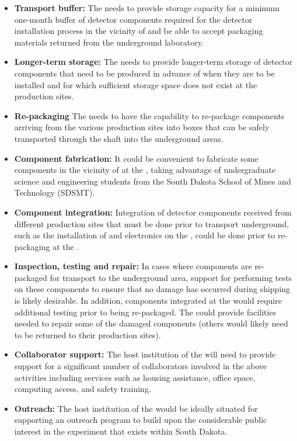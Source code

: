 \begin{itemize}
  \item {\bf Transport buffer:} The  needs to provide
    storage capacity for a minimum one-month buffer of detector
    components required for the detector installation process in the
    vicinity of \surf and be able to accept packaging materials
    returned from the underground laboratory.
  \item {\bf Longer-term storage:} The  needs to provide
    longer-term storage of detector components that need to be
    produced in advance of when they are to be installed and for which
    sufficient storage space does not exist at the production sites.
  \item {\bf Re-packaging} The  needs to have the capability
    to re-package components arriving from the various production
    sites into boxes that can be safely transported through the shaft
    into the underground areas.
  \item {\bf Component fabrication:} It could be convenient to fabricate some
  components %
  in the vicinity
    of \surf at the , taking advantage of
    undergraduate science and engineering students from the South
    Dakota School of Mines and Technology (SDSMT).
  \item {\bf Component integration:} Integration of detector components
  received from different production sites %
  that must be done prior to transport underground,
    such as the installation of  and 
    electronics on the , could be done
    prior to re-packaging at the .    
  \item {\bf Inspection, testing and repair:} In cases where
    components are re-packaged for transport to the underground area,
     support for performing tests on these components to
    ensure that no damage has occurred during shipping is likely
    desirable.  In addition, components integrated at the 
    would require additional testing prior to being re-packaged.  The
     could provide facilities needed to repair some of the
    damaged components (others would likely need to be returned to
    their production sites).
  \item {\bf Collaborator support:} The host institution of the 
    will need to %
    provide support for a significant number
    of  collaborators involved in the above activities
    including services such as housing assistance, office space,
    computing access, and safety training.
  \item {\bf Outreach:} The host institution of the  would be
    ideally situated for supporting an outreach program to build upon
    the considerable public interest in the experiment that exists
    within South Dakota.
\end{itemize}

